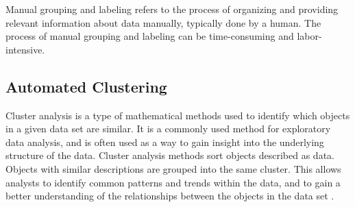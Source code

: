 Manual grouping and labeling refers to the process of organizing and
providing relevant information about data manually, typically done by a
human. The process of manual grouping and labeling can be time-consuming
and labor-intensive.




\subsection{Automated Clustering}

Cluster analysis is a type of mathematical methods used to identify which
objects in a given data set are similar. It is a commonly used method for
exploratory data analysis, and is often used as a way to gain insight into
the underlying structure of the data. Cluster analysis methods sort
objects described as data. Objects with similar descriptions are grouped
into the same cluster. This allows analysts to identify common patterns
and trends within the data, and to gain a better understanding of the
relationships between the objects in the data set
\parencite{romesburg1984cluster}.



